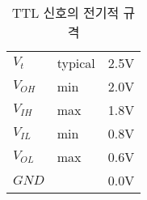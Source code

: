 %
\begin{table}[htbp]
\caption{TTL 신호의 전기적 규격}\label{table:ttl-spec}
   \begin{center}
   \begin{tabular}{|l l|l|} \hline
	$V_t$    & typical & 2.5V\\
	$V_{OH}$ & min     & 2.0V\\
	$V_{IH}$ & max     & 1.8V\\
	$V_{IL}$ & min     & 0.8V\\
	$V_{OL}$ & max     & 0.6V\\
	$GND$    &         & 0.0V\\ \hline
   \end{tabular}
   \end{center}
\end{table}
%

